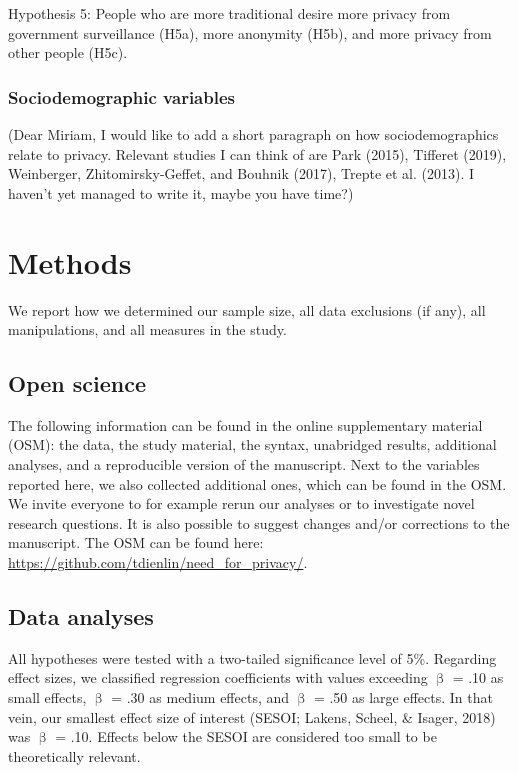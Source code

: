 \documentclass[man,floatsintext]{apa6}
\theoremstyle{definition}
\theoremstyle{definition}
\theoremstyle{definition}
\theoremstyle{remark}
\begin{document}
Hypothesis 5: People who are more traditional desire more privacy from
government surveillance (H5a), more anonymity (H5b), and more privacy
from other people (H5c).

\hypertarget{sociodemographic-variables}{%
\subsubsection{Sociodemographic
variables}\label{sociodemographic-variables}}

(Dear Miriam, I would like to add a short paragraph on how
sociodemographics relate to privacy. Relevant studies I can think of are
Park (2015), Tifferet (2019), Weinberger, Zhitomirsky-Geffet, and
Bouhnik (2017), Trepte et al. (2013). I haven't yet managed to write it,
maybe you have time?)

\hypertarget{methods}{%
\section{Methods}\label{methods}}

We report how we determined our sample size, all data exclusions (if
any), all manipulations, and all measures in the study.

\hypertarget{open-science}{%
\subsection{Open science}\label{open-science}}

The following information can be found in the online supplementary
material (OSM): the data, the study material, the syntax, unabridged
results, additional analyses, and a reproducible version of the
manuscript. Next to the variables reported here, we also collected
additional ones, which can be found in the OSM. We invite everyone to
for example rerun our analyses or to investigate novel research
questions. It is also possible to suggest changes and/or corrections to
the manuscript. The OSM can be found here:
\url{https://github.com/tdienlin/need_for_privacy/}.

\hypertarget{data-analyses}{%
\subsection{Data analyses}\label{data-analyses}}

All hypotheses were tested with a two-tailed significance level of 5\%.
Regarding effect sizes, we classified regression coefficients with
values exceeding \(\upbeta\) = .10 as small effects, \(\upbeta\) = .30
as medium effects, and \(\upbeta\) = .50 as large effects. In that vein,
our smallest effect size of interest (SESOI; Lakens, Scheel, \& Isager,
2018) was \(\upbeta\) = .10. Effects below the SESOI are considered too
small to be theoretically relevant.
\end{document}

